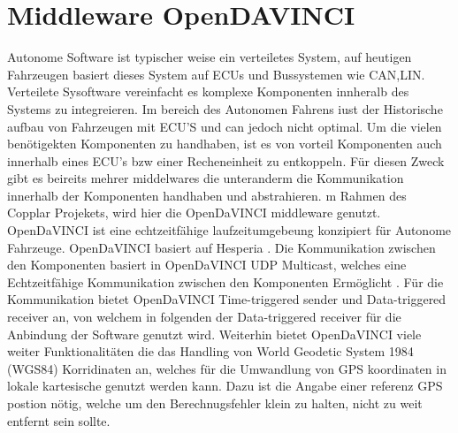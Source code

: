 \section{Middleware OpenDAVINCI}
Autonome Software ist typischer weise ein verteiletes System, auf heutigen Fahrzeugen basiert dieses System auf ECUs und Bussystemen wie CAN,LIN.
Verteilete Sysoftware vereinfacht es komplexe Komponenten innheralb des Systems zu integreieren. Im bereich des Autonomen Fahrens iust der Historische aufbau von Fahrzeugen
mit ECU'S und can jedoch nicht optimal. Um die vielen benötigekten Komponenten zu handhaben, ist es von vorteil Komponenten auch innerhalb eines ECU's bzw einer Recheneinheit
zu entkoppeln. Für diesen Zweck gibt es beireits mehrer middelwares die unteranderm die Kommunikation innerhalb der Komponenten handhaben und abstrahieren.
m Rahmen des Copplar Projekets, wird hier die OpenDaVINCI middleware genutzt. OpenDaVINCI ist eine echtzeitfähige laufzeitumgebeung konzipiert für Autonome Fahrzeuge.
OpenDaVINCI basiert auf Hesperia \cite{Berger2010}. Die Kommunikation zwischen den Komponenten basiert in OpenDaVINCI UDP Multicast, welches eine Echtzeitfähige Kommunikation zwischen
den Komponenten Ermöglicht \cite{Kurose2013}. Für die Kommunikation bietet OpenDaVINCI Time-triggered sender und Data-triggered receiver an, von welchem in folgenden der Data-triggered receiver
für die Anbindung der Software genutzt wird. Weiterhin bietet OpenDaVINCI viele weiter Funktionalitäten die das Handling von World Geodetic System 1984 (WGS84) Korridinaten an, welches für die Umwandlung
von GPS koordinaten in lokale kartesische genutzt werden kann. Dazu ist die Angabe einer referenz GPS postion nötig, welche um den Berechnugsfehler klein zu halten,
nicht zu weit entfernt sein sollte.






